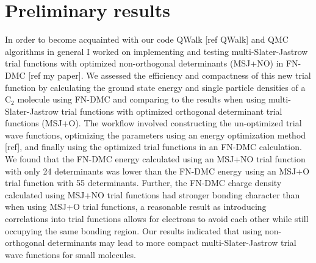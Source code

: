 \documentclass{article}
\begin{document}
\section{Preliminary results}
In order to become acquainted with our code QWalk [ref QWalk] and QMC algorithms in general I worked on implementing and testing multi-Slater-Jastrow trial functions with optimized non-orthogonal determinants (MSJ+NO) in FN-DMC [ref my paper]. We assessed the efficiency and compactness of this new trial function by calculating the ground state energy and single particle densities of a C$_2$ molecule using FN-DMC and comparing to the results when using multi-Slater-Jastrow trial functions with optimized orthogonal determinant trial functions (MSJ+O). The workflow involved constructing the un-optimized trial wave functions, optimizing the parameters using an energy optimization method [ref], and finally using the optimized trial functions in an FN-DMC calculation. We found that the FN-DMC energy calculated using an MSJ+NO trial function with only 24 determinants was lower than the FN-DMC energy using an MSJ+O trial function with 55 determinants. Further, the FN-DMC charge density calculated using MSJ+NO trial functions had stronger bonding character than when using MSJ+O trial functions, a reasonable result as introducing correlations into trial functions allows for electrons to avoid each other while still occupying the same bonding region. Our results indicated that using non-orthogonal determinants may lead to more compact multi-Slater-Jastrow trial wave functions for small molecules.
\end{document}

